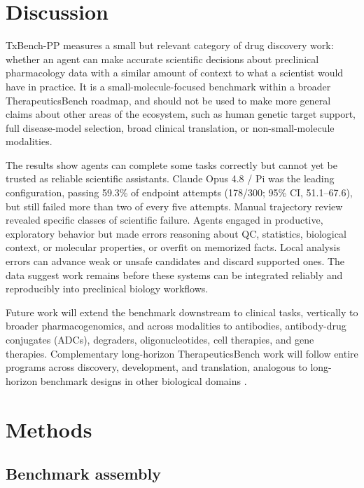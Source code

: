 \documentclass[10pt,letterpaper]{article}
\begin{document}
\section{Discussion}

TxBench-PP measures a small but relevant category of drug discovery work:
whether an agent can make accurate scientific decisions about preclinical
pharmacology data with a similar amount of context to what a scientist would
have in practice. It is a small-molecule-focused benchmark within a broader
TherapeuticsBench roadmap, and should not be used to make more general claims
about other areas of the ecosystem, such as human genetic target support, full
disease-model selection, broad clinical translation, or non-small-molecule
modalities.

The results show agents can complete some tasks correctly but cannot yet be
trusted as reliable scientific assistants. Claude Opus 4.8 / Pi was the leading
configuration, passing 59.3\% of endpoint attempts (178/300; 95\% CI,
51.1--67.6), but still failed more than two of every five attempts. Manual
trajectory review revealed specific classes of scientific failure. Agents
engaged in productive, exploratory behavior but made errors reasoning about QC,
statistics, biological context, or molecular properties, or overfit on
memorized facts. Local analysis errors can advance weak or unsafe candidates and
discard supported ones. The data suggest work remains before these systems can
be integrated reliably and reproducibly into preclinical biology workflows.

Future work will extend the benchmark downstream to clinical tasks, vertically
to broader pharmacogenomics, and
across modalities to antibodies, antibody-drug conjugates (ADCs), degraders,
oligonucleotides, cell therapies, and gene therapies. Complementary long-horizon
TherapeuticsBench work will follow entire programs across discovery,
development, and translation, analogous to long-horizon benchmark designs in
other biological domains \cite{spatialbenchlong2026}.

\columnbreak

\section{Methods}

\subsection{Benchmark assembly}
\end{document}
